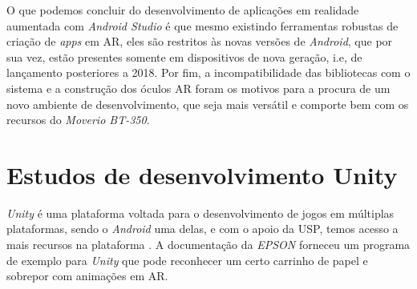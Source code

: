 
O que podemos concluir do desenvolvimento de aplicações em realidade aumentada com \textit{Android Studio} é que mesmo existindo ferramentas robustas de criação de \textit{apps} em AR, eles são restritos às novas versões de \textit{Android}, que por sua vez, estão presentes somente em dispositivos de nova geração, i.e, de lançamento posteriores a 2018. Por fim, a incompatibilidade das bibliotecas com o sistema e a construção dos óculos AR foram os motivos para a procura de um novo ambiente de desenvolvimento, que seja mais versátil e comporte bem com os recursos do \textit{Moverio BT-350}.

\section{Estudos de desenvolvimento Unity}

\textit{Unity} é uma plataforma voltada para o desenvolvimento de jogos em múltiplas plataformas, sendo o \textit{Android} uma delas, e com o apoio da USP, temos acesso a mais recursos na plataforma \cite{UnityOficial}. A documentação da \textit{EPSON} forneceu um programa de exemplo para \textit{Unity} que pode reconhecer um certo carrinho de papel e sobrepor com animações em AR.


